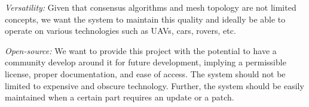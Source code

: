 \textit{Versatility:} Given that consensus algorithms and mesh topology are not limited concepts, we want the system to maintain this quality and ideally be able to operate on various technologies such as UAVs, cars, rovers, etc.

\textit{Open-source:} We want to provide this project with the potential to have a community develop around it for future development, implying a permissible license, proper documentation, and ease of access. The system should not be limited to expensive and obscure technology. Further, the system should be easily maintained when a certain part requires an update or a patch.